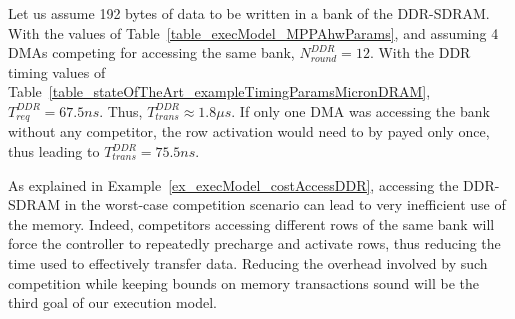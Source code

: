 \documentclass[main.tex]{subfiles}
\begin{document}
\begin{example}
    \label{ex_execModel_costAccessDDR}
    Let us assume 192 bytes of data to be written in a bank of the DDR-SDRAM.
    With the values of Table~\ref{table_execModel_MPPAhwParams}, and assuming 4
    DMAs competing for accessing the same bank, $N_{round}^{DDR} = 12$. With
    the DDR timing values of
    Table~\ref{table_stateOfTheArt_exampleTimingParamsMicronDRAM},
    $T_{req}^{DDR} = 67.5ns$. Thus, $T_{trans}^{DDR} \approx 1.8 \mu s$. If
    only one DMA was accessing the bank without any competitor, the row
    activation would need to by payed only once, thus leading to
    $T_{trans}^{DDR} = 75.5ns$.
\end{example}

As explained in Example~\ref{ex_execModel_costAccessDDR}, accessing the
DDR-SDRAM in the worst-case competition scenario can lead to very inefficient
use of the memory. Indeed, competitors accessing different rows of the same
bank will force the controller to repeatedly precharge and activate rows, thus
reducing the time used to effectively transfer data. Reducing the overhead
involved by such competition while keeping bounds on memory transactions sound
will be the third goal of our execution model.
\end{document}
